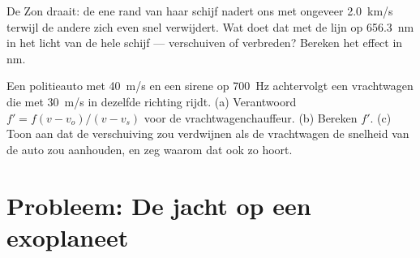 \begin{exercise}[$\star\star\star$]\label{exo:g12:doppler-effect:14}
De Zon draait: de ene rand van haar schijf nadert ons met ongeveer
\qty{2.0}{km/s} terwijl de andere zich even snel verwijdert. Wat doet dat
met de lijn op \qty{656.3}{nm} in het licht van de hele schijf ---
verschuiven of verbreden? Bereken het effect in \unit{nm}.
\end{exercise}

\begin{exercise}[$\star\star\star$]\label{exo:g12:doppler-effect:15}
Een politieauto met \qty{40}{m/s} en een sirene op \qty{700}{Hz}
achtervolgt een vrachtwagen die met \qty{30}{m/s} in dezelfde richting
rijdt. (a) Verantwoord $f' = f(v - v_o)/(v - v_s)$ voor de
vrachtwagenchauffeur. (b) Bereken $f'$. (c) Toon aan dat de verschuiving
zou verdwijnen als de vrachtwagen de snelheid van de auto zou aanhouden,
en zeg waarom dat ook zo hoort.
\end{exercise}

\section{Probleem: De jacht op een exoplaneet}

